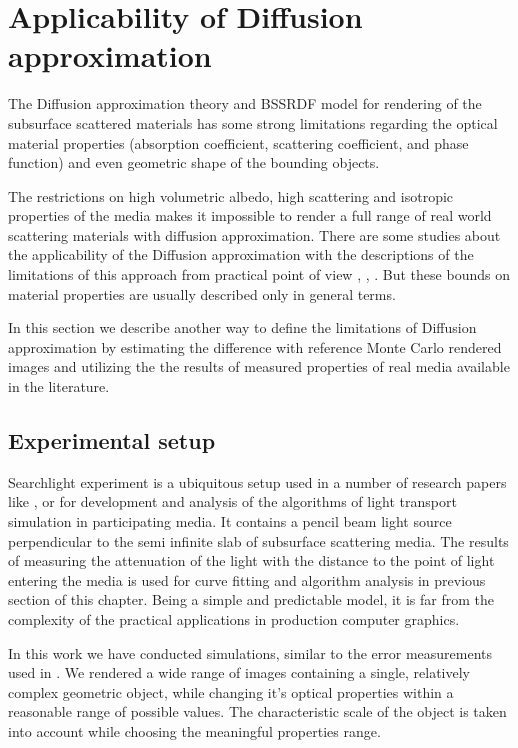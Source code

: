 \newpage
\section{Applicability of Diffusion approximation}
\label{chapter:measurements}

The Diffusion approximation theory and BSSRDF model for rendering of the subsurface scattered
materials has some strong limitations regarding the optical material properties (absorption
coefficient, scattering coefficient, and phase function) and even geometric shape of the bounding
objects.

The restrictions on high volumetric albedo, high scattering and isotropic properties of the media
makes it impossible to render a full range of real world scattering materials with diffusion
approximation.
There are some studies about the applicability of the Diffusion approximation with the descriptions
of the limitations of this approach from practical point of view \cite{Donner:2009:EBM},
\cite{Gkioulekas:2013:URP:2516971.2516972}, \cite{Zhao:2014:HSR:2601097.2601104}. But these bounds
on material properties are usually described only in general terms.

In this section we describe another way to define the limitations of Diffusion approximation  by
estimating the difference with reference Monte Carlo rendered images and utilizing the the results
of measured properties of real media available in the literature.

\subsection{Experimental setup}
Searchlight experiment is a ubiquitous setup used in a number of research papers like
\cite{Jensen:2001:PMS:383259.383319}, \cite{Donner:2009:EBM} or \cite{habel13cid} for development
and analysis of the  algorithms of light transport simulation in participating media. It contains a
pencil beam light source perpendicular to the semi infinite slab of subsurface scattering media. The
results of measuring the attenuation of the light with the distance to the point of light entering
the media is used for curve fitting and algorithm analysis in previous section of this chapter.
Being a simple and predictable model, it is far from the complexity of the practical applications in
production computer graphics.

In this work we have conducted simulations, similar to the error measurements used in
\cite{Zhao:2014:HSR:2601097.2601104}. We rendered a wide range of images containing a single,
relatively complex geometric object, while changing it's optical properties within a reasonable
range of possible values. The characteristic scale of the object is taken into account while
choosing the meaningful properties range.

